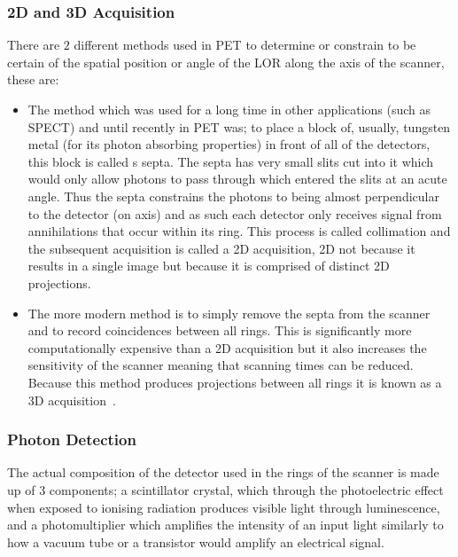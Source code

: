             \subsubsection{2D and 3D Acquisition} \label{2d_and_3d_acquisition}
                There are $2$ different methods used in \gls{PET} to determine or constrain to be certain of the spatial position or angle of the \gls{LOR} along the axis of the scanner, these are:
                
                \begin{itemize}
                    \item The method which was used for a long time in other applications (such as \gls{SPECT}) and until recently in \gls{PET} was; to place a block of, usually, tungsten metal (for its photon absorbing properties) in front of all of the detectors, this block is called s septa. The septa has very small slits cut into it which would only allow photons to pass through which entered the slits at an acute angle. Thus the septa constrains the photons to being almost perpendicular to the detector (on axis) and as such each detector only receives signal from annihilations that occur within its ring. This process is called collimation and the subsequent acquisition is called a \gls{2D} acquisition, \gls{2D} not because it results in a single image but because it is comprised of distinct \gls{2D} projections.
                    
                    \item The more modern method is to simply remove the septa from the scanner and to record coincidences between all rings. This is significantly more computationally expensive than a \gls{2D} acquisition but it also increases the sensitivity of the scanner meaning that scanning times can be reduced. Because this method produces projections between all rings it is known as a \gls{3D} acquisition~.
                \end{itemize}
            
            \subsubsection{Photon Detection} \label{photon_detection}
                The actual composition of the detector used in the rings of the scanner is made up of $3$ components; a scintillator crystal, which through the photoelectric effect when exposed to ionising radiation produces visible light through luminescence, and a photomultiplier which amplifies the intensity of an input light similarly to how a vacuum tube or a transistor would amplify an electrical signal.
                
